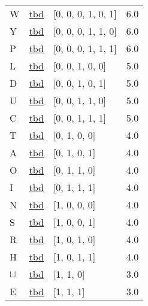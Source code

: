 \documentclass[12pt]{article}
\begin{document}
\begin{tabular}{l l l l}
W	&	\url{tbd}	&	[0, 0, 0, 1, 0, 1]	&	6.0\\
Y	&	\url{tbd}	&	[0, 0, 0, 1, 1, 0]	&	6.0\\
P	&	\url{tbd}	&	[0, 0, 0, 1, 1, 1]	&	6.0\\
L	&	\url{tbd}	&	[0, 0, 1, 0, 0]	&	5.0\\
D	&	\url{tbd}	&	[0, 0, 1, 0, 1]	&	5.0\\
U	&	\url{tbd}	&	[0, 0, 1, 1, 0]	&	5.0\\
C	&	\url{tbd}	&	[0, 0, 1, 1, 1]	&	5.0\\
T	&	\url{tbd}	&	[0, 1, 0, 0]	&	4.0\\
A	&	\url{tbd}	&	[0, 1, 0, 1]	&	4.0\\
O	&	\url{tbd}	&	[0, 1, 1, 0]	&	4.0\\
I	&	\url{tbd}	&	[0, 1, 1, 1]	&	4.0\\
N	&	\url{tbd}	&	[1, 0, 0, 0]	&	4.0\\
S	&	\url{tbd}	&	[1, 0, 0, 1]	&	4.0\\
R	&	\url{tbd}	&	[1, 0, 1, 0]	&	4.0\\
H	&	\url{tbd}	&	[1, 0, 1, 1]	&	4.0\\
$\sqcup$	&	\url{tbd}	&	[1, 1, 0]	&	3.0\\
E	&	\url{tbd}	&	[1, 1, 1]	&	3.0\\
\end{tabular}
\end{document}
